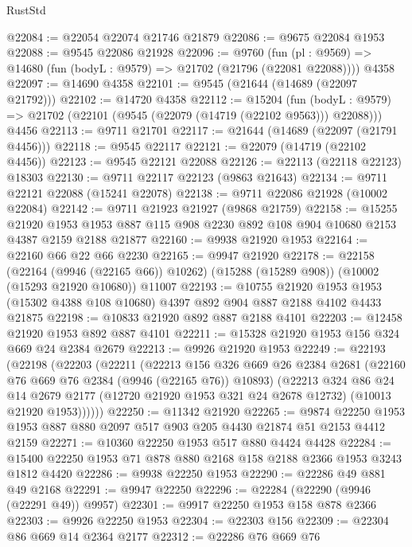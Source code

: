 \begin{lexlean}{RustStd}
\begin{coremodule}
@22084 := @22054 @22074 @21746 @21879
@22086 := @9675 @22084 @1953
@22088 := @9545 @22086 @21928
@22096 := @9760
    (fun (pl : @9569) => @14680 (fun (bodyL : @9579) => @21702 (@21796 (@22081 @22088))))
    @4358
@22097 := @14690 @4358
@22101 := @9545 (@21644 (@14689 (@22097 @21792)))
@22102 := @14720 @4358
@22112 := @15204
    (fun (bodyL : @9579) => @21702 (@22101 (@9545 (@22079 (@14719 (@22102 @9563))) @22088)))
    @4456
@22113 := @9711 @21701
@22117 := @21644 (@14689 (@22097 (@21791 @4456)))
@22118 := @9545 @22117
@22121 := @22079 (@14719 (@22102 @4456))
@22123 := @9545 @22121 @22088
@22126 := @22113 (@22118 @22123) @18303
@22130 := @9711 @22117 @22123 (@9863 @21643)
@22134 := @9711 @22121 @22088 (@15241 @22078)
@22138 := @9711 @22086 @21928 (@10002 @22084)
@22142 := @9711 @21923 @21927 (@9868 @21759)
@22158 := @15255
    @21920
    @1953
    @1953
    @887
    @115
    @908
    @2230
    @892
    @108
    @904
    @10680
    @2153
    @4387
    @2159
    @2188
    @21877
@22160 := @9938 @21920 @1953
@22164 := @22160 @66 @22 @66 @2230
@22165 := @9947 @21920
@22178 := @22158
    (@22164 (@9946 (@22165 @66)) @10262)
    (@15288 (@15289 @908))
    (@10002 (@15293 @21920 @10680))
    @11007
@22193 := @10755
    @21920
    @1953
    @1953
    (@15302 @4388 @108 @10680)
    @4397
    @892
    @904
    @887
    @2188
    @4102
    @4433
    @21875
@22198 := @10833 @21920 @892 @887 @2188 @4101
@22203 := @12458 @21920 @1953 @892 @887 @4101
@22211 := @15328 @21920 @1953 @156 @324 @669 @24 @2384 @2679
@22213 := @9926 @21920 @1953
@22249 := @22193
    (@22198
      (@22203
        (@22211
          (@22213
            @156
            @326
            @669
            @26
            @2384
            @2681
            (@22160 @76 @669 @76 @2384 (@9946 (@22165 @76)) @10893)
            (@22213
              @324
              @86
              @24
              @14
              @2679
              @2177
              (@12720 @21920 @1953 @321 @24 @2678 @12732)
              (@10013 @21920 @1953))))))
@22250 := @11342 @21920
@22265 := @9874 @22250 @1953 @1953 @887 @880 @2097 @517 @903 @205 @4430 @21874 @51 @2153 @4412 @2159
@22271 := @10360 @22250 @1953 @517 @880 @4424 @4428
@22284 := @15400 @22250 @1953 @71 @878 @880 @2168 @158 @2188 @2366 @1953 @3243 @1812 @4420
@22286 := @9938 @22250 @1953
@22290 := @22286 @49 @881 @49 @2168
@22291 := @9947 @22250
@22296 := @22284 (@22290 (@9946 (@22291 @49)) @9957)
@22301 := @9917 @22250 @1953 @158 @878 @2366
@22303 := @9926 @22250 @1953
@22304 := @22303 @156
@22309 := @22304 @86 @669 @14 @2364 @2177
@22312 := @22286 @76 @669 @76

\end{coremodule}
\end{lexlean}
